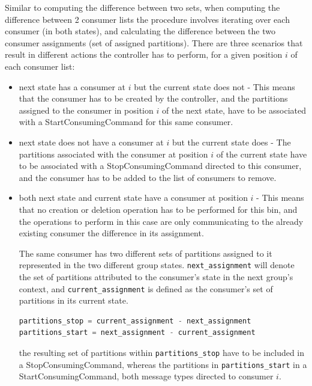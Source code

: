 Similar to computing the difference between two sets, when computing the
difference between 2 consumer lists the procedure involves iterating over each
consumer (in both states), and calculating the difference between the two consumer
assignments (set of assigned partitions). There are three scenarios that result
in different actions the controller has to perform, for a given position $i$ of
each consumer list: 
\begin{itemize} 
    \item next state has a consumer at $i$ but the current state does not - This
        means that the consumer has to be created by the controller, and the
        partitions assigned to the consumer in position $i$ of the next state,
        have to be associated with a StartConsumingCommand for this same
        consumer.  
    \item next state does not have a consumer at $i$ but the current state
        does - The partitions associated with the consumer at position $i$ of
        the current state have to be associated with a StopConsumingCommand
        directed to this consumer, and the consumer has to be added to the list
        of consumers to remove.  
    \item both next state and current state have a consumer at position $i$ -
        This means that no creation or deletion operation has to be performed
        for this bin, and the operations to perform in this case are only
        communicating to the already existing consumer the difference in its
        assignment. 
    
        The same consumer has two different sets of partitions assigned to it
        represented in the two different group states.
        \lstinline[language=Python]{next_assignment} will denote the set of
        partitions attributed to the consumer's state in the next group's
        context, and \lstinline[language=Python]{current_assignment} is defined
        as the consumer's set of partitions in its current state.
    
\begin{lstlisting}[language=Python] 
partitions_stop = current_assignment - next_assignment 
partitions_start = next_assignment - current_assignment
\end{lstlisting} 
        the resulting set of partitions within \lstinline{partitions_stop} have
        to be included in a StopConsumingCommand, whereas the partitions in
        \lstinline{partitions_start} in a StartConsumingCommand, both message
        types directed to consumer $i$.
\end{itemize}

